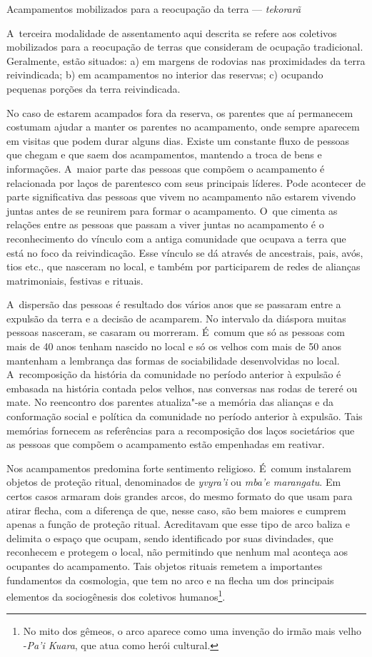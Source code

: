 Acampamentos mobilizados para a reocupação da terra --- \emph{tekorarã}

A~terceira modalidade de assentamento aqui descrita se refere aos
coletivos mobilizados para a reocupação de terras que consideram de
ocupação tradicional. Geralmente, estão situados: a) em margens de
rodovias nas proximidades da terra reivindicada; b) em acampamentos no
interior das reservas; c) ocupando pequenas porções da terra
reivindicada. 

No caso de estarem acampados fora da reserva, os parentes que aí
permanecem costumam ajudar a manter os parentes no acampamento, onde
sempre aparecem em visitas que podem durar alguns dias. Existe um
constante fluxo de pessoas que chegam e que saem dos acampamentos,
mantendo a troca de bens e informações. A~maior parte das pessoas que
compõem o acampamento é relacionada por laços de parentesco com seus
principais líderes. Pode acontecer de parte significativa das pessoas
que vivem no acampamento não estarem vivendo juntas antes de se
reunirem para formar o acampamento. O~que cimenta as relações entre as
pessoas que passam a viver juntas no acampamento é o reconhecimento do
vínculo com a antiga comunidade que ocupava a terra que está no foco da
reivindicação. Esse vínculo se dá através de ancestrais, pais, avós,
tios etc., que nasceram no local, e também por participarem de redes de
alianças matrimoniais, festivas e rituais. 

A~dispersão das pessoas é resultado dos vários anos que se passaram
entre a expulsão da terra e a decisão de acamparem. No intervalo da
diáspora muitas pessoas nasceram, se casaram ou morreram. É~comum que
só as pessoas com mais de 40 anos tenham nascido no local e só os
velhos com mais de 50 anos mantenham a lembrança das formas de
sociabilidade desenvolvidas no local. A~recomposição da história da
comunidade no período anterior à expulsão é embasada na história
contada pelos velhos, nas conversas nas rodas de tereré ou mate. No
reencontro dos parentes atualiza"-se a memória das alianças e da
conformação social e política da comunidade no período anterior à
expulsão. Tais memórias fornecem as referências para a recomposição dos
laços societários que as pessoas que compõem o acampamento estão
empenhadas em reativar. 

Nos acampamentos predomina forte sentimento religioso. É~comum
instalarem objetos de proteção ritual, denominados de \emph{yvyra’i} ou \emph{mba’e
marangatu}. Em certos casos armaram dois grandes arcos, do mesmo formato
do que usam para atirar flecha, com a diferença de que, nesse caso, são
bem maiores e cumprem apenas a função de proteção ritual. Acreditavam
que esse tipo de arco baliza e delimita o espaço que ocupam, sendo
identificado por suas divindades, que reconhecem e protegem o local,
não permitindo que nenhum mal aconteça aos ocupantes do acampamento.
Tais objetos rituais remetem a importantes fundamentos da cosmologia,
que tem no arco e na flecha um dos principais elementos da sociogênesis
dos coletivos humanos\footnote{No mito dos gêmeos, o arco aparece como
uma invenção do irmão mais velho -\emph{Pa’i Kuara}, que atua como herói
cultural.}.

